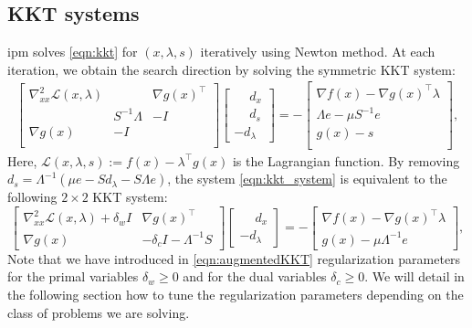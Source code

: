 \documentclass{article}
\begin{document}
\subsection{KKT systems}
\Gls*{ipm} solves \cref{eqn:kkt} for $(x, \lambda, s)$ iteratively using Newton method. At each iteration, we obtain the
search direction by solving the symmetric KKT system:
\begin{align}\label{eqn:kkt_system}
  \begin{bmatrix}
    \nabla^2_{x x} \mathcal{L}(x,\lambda) && \nabla g(x)^\top  \\
                                          & S^{-1}\Lambda & -I \\
    \nabla g(x) & -I & \\
  \end{bmatrix}
  \begin{bmatrix}
    \phantom{-}d_x\\
    \phantom{-}d_s \\
    -d_\lambda
  \end{bmatrix} =
  -\begin{bmatrix}
    \nabla f(x) - \nabla g(x)^\top \lambda\\
    \Lambda e - \mu S^{-1} e \\
    g(x) - s\\
  \end{bmatrix},
\end{align}
Here,
$\mathcal{L}(x,\lambda,s)  := f(x) - \lambda^\top g(x)$ is the Lagrangian function.
By removing $d_s = \Lambda^{-1} \left(\mu e - S d_\lambda - S\Lambda e\right)$, the system
\eqref{eqn:kkt_system} is equivalent to the following $2\times 2$ KKT system:
\begin{equation}\label{eqn:augmentedKKT}
  \begin{bmatrix}
    \nabla^2_{x x} \mathcal{L}(x,\lambda) + \delta_w I & \nabla g(x)^\top \\
    \nabla g(x) &  - \delta_c I - \Lambda^{-1} S
  \end{bmatrix}
  \begin{bmatrix}
    \phantom{-}d_x\\
    - d_\lambda
  \end{bmatrix} =
  -\begin{bmatrix}
    \nabla f(x) - \nabla g(x)^\top \lambda\\
    g(x) - \mu \Lambda^{-1} e
  \end{bmatrix},
\end{equation}
Note that we have introduced in \eqref{eqn:augmentedKKT} regularization parameters for the primal variables
$\delta_w\geq 0$ and for the dual variables $\delta_c\geq 0$. We will detail
in the following section how to tune the regularization parameters depending on
the class of problems we are solving.
\end{document}
